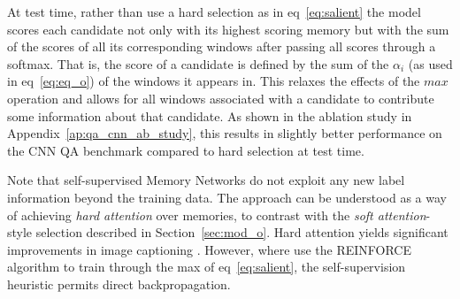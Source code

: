 %

%


%
At test time, rather than use a hard selection as in eq~\eqref{eq:salient}
the model scores each candidate not only with its highest scoring memory
but with the sum of the scores of all its corresponding windows after passing all scores through a softmax. That is, the score of a candidate is defined by the sum of the $\alpha_i$ (as used in eq~\eqref{eq:eq_o}) of the windows it appears in. This relaxes the effects of the \(max\) operation and allows for all windows associated with a candidate to contribute some information about that candidate. As shown in the ablation study in Appendix~\ref{ap:qa_cnn_ab_study}, this results in slightly better performance on the CNN QA benchmark compared to hard selection at test time.

Note that self-supervised Memory Networks do not exploit any new label information beyond the training data. %
The approach can be understood as a way of achieving \emph{hard attention} over memories, to contrast with the \emph{soft attention}-style selection described in Section~\ref{sec:mod_o}. Hard attention yields significant improvements in image captioning \citep{xu2015show}. However, where \cite{xu2015show} use the REINFORCE algorithm \citep{williams1992simple} to train through the max of eq~\eqref{eq:salient}, the self-supervision heuristic permits direct backpropagation.






